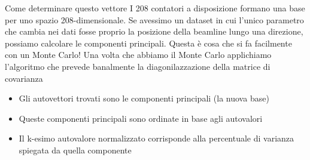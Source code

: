 \documentclass[
10pt,
aspectratio=169,
]{beamer}
\begin{document}
\begin{frame}{Come determinare questo vettore}
I 208 contatori a disposizione formano una base per uno spazio 208-dimensionale. 
\vfill
Se avessimo un dataset in cui l'unico parametro che cambia nei dati fosse proprio la posizione della beamline lungo una direzione, possiamo calcolare le componenti principali.
\vfill
Questa è cosa che si fa facilmente con un Monte Carlo!
\vfill
Una volta che abbiamo il Monte Carlo applichiamo l'algoritmo che prevede banalmente la diagonilazzazione della matrice di covarianza
\begin{itemize}
    \item Gli autovettori trovati sono le componenti principali (la nuova base)
    \item Queste componenti principali sono ordinate in base agli autovalori
    \item Il k-esimo autovalore normalizzato corrisponde alla percentuale di varianza spiegata da quella componente
\end{itemize}

\end{frame}
\end{document}
